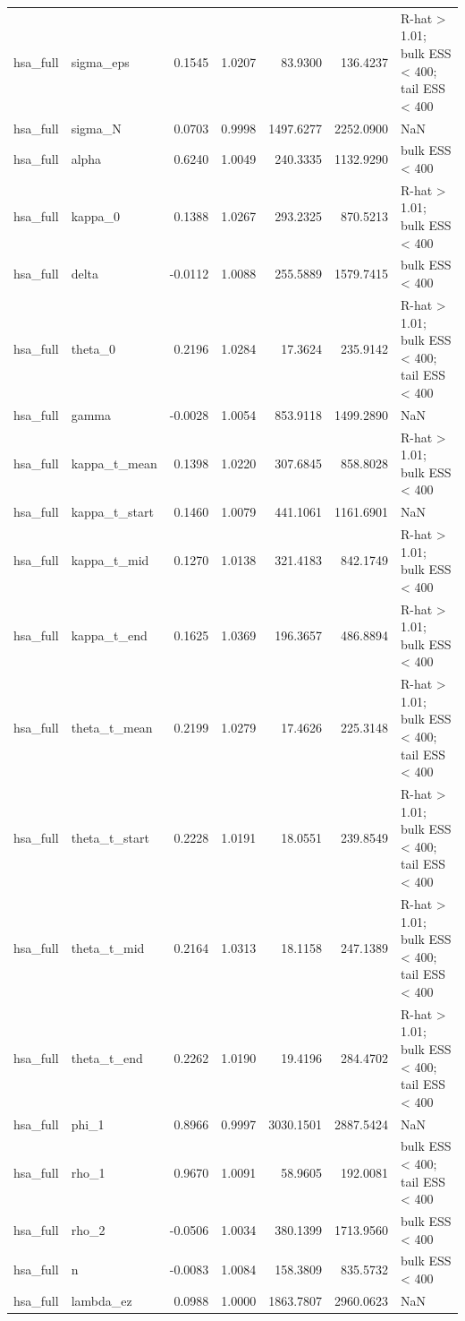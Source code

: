 \begin{tabular}{llrrrrl}
hsa\_full & sigma\_eps & 0.1545 & 1.0207 & 83.9300 & 136.4237 & R-hat > 1.01; bulk ESS < 400; tail ESS < 400 \\
hsa\_full & sigma\_N & 0.0703 & 0.9998 & 1497.6277 & 2252.0900 & NaN \\
hsa\_full & alpha & 0.6240 & 1.0049 & 240.3335 & 1132.9290 & bulk ESS < 400 \\
hsa\_full & kappa\_0 & 0.1388 & 1.0267 & 293.2325 & 870.5213 & R-hat > 1.01; bulk ESS < 400 \\
hsa\_full & delta & -0.0112 & 1.0088 & 255.5889 & 1579.7415 & bulk ESS < 400 \\
hsa\_full & theta\_0 & 0.2196 & 1.0284 & 17.3624 & 235.9142 & R-hat > 1.01; bulk ESS < 400; tail ESS < 400 \\
hsa\_full & gamma & -0.0028 & 1.0054 & 853.9118 & 1499.2890 & NaN \\
hsa\_full & kappa\_t\_mean & 0.1398 & 1.0220 & 307.6845 & 858.8028 & R-hat > 1.01; bulk ESS < 400 \\
hsa\_full & kappa\_t\_start & 0.1460 & 1.0079 & 441.1061 & 1161.6901 & NaN \\
hsa\_full & kappa\_t\_mid & 0.1270 & 1.0138 & 321.4183 & 842.1749 & R-hat > 1.01; bulk ESS < 400 \\
hsa\_full & kappa\_t\_end & 0.1625 & 1.0369 & 196.3657 & 486.8894 & R-hat > 1.01; bulk ESS < 400 \\
hsa\_full & theta\_t\_mean & 0.2199 & 1.0279 & 17.4626 & 225.3148 & R-hat > 1.01; bulk ESS < 400; tail ESS < 400 \\
hsa\_full & theta\_t\_start & 0.2228 & 1.0191 & 18.0551 & 239.8549 & R-hat > 1.01; bulk ESS < 400; tail ESS < 400 \\
hsa\_full & theta\_t\_mid & 0.2164 & 1.0313 & 18.1158 & 247.1389 & R-hat > 1.01; bulk ESS < 400; tail ESS < 400 \\
hsa\_full & theta\_t\_end & 0.2262 & 1.0190 & 19.4196 & 284.4702 & R-hat > 1.01; bulk ESS < 400; tail ESS < 400 \\
hsa\_full & phi\_1 & 0.8966 & 0.9997 & 3030.1501 & 2887.5424 & NaN \\
hsa\_full & rho\_1 & 0.9670 & 1.0091 & 58.9605 & 192.0081 & bulk ESS < 400; tail ESS < 400 \\
hsa\_full & rho\_2 & -0.0506 & 1.0034 & 380.1399 & 1713.9560 & bulk ESS < 400 \\
hsa\_full & n & -0.0083 & 1.0084 & 158.3809 & 835.5732 & bulk ESS < 400 \\
hsa\_full & lambda\_ez & 0.0988 & 1.0000 & 1863.7807 & 2960.0623 & NaN \\

\end{tabular}
